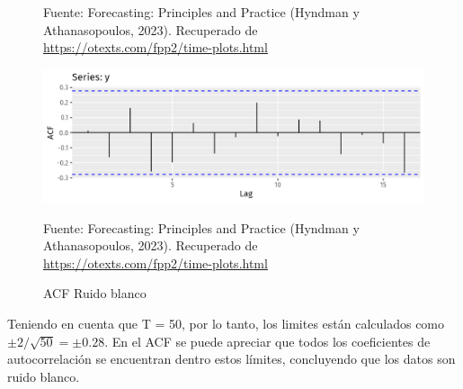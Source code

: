 \begin{itemize}
\begin{figure}[H]
        \begin{minipage}[t]{0.9\textwidth}
            Fuente: Forecasting: Principles and Practice (Hyndman y Athanasopoulos, 2023). Recuperado de \url{https://otexts.com/fpp2/time-plots.html}
        \end{minipage}
    \end{figure}

    \begin{figure}[H]
        \begin{minipage}[t]{0.9\textwidth}
            \caption{ACF Ruido blanco}
            \label{whitenoise2}        
        \end{minipage}
    
        \vspace{10pt}
    
        \begin{minipage}[b]{1.1\textwidth}
            \centering
            \includegraphics[width=\textwidth]{img/wnoiseacf-1.png}        
        \end{minipage}
    
        \begin{minipage}[t]{0.9\textwidth}
            Fuente: Forecasting: Principles and Practice (Hyndman y Athanasopoulos, 2023). Recuperado de \url{https://otexts.com/fpp2/time-plots.html}
        \end{minipage}
    \end{figure}

    Teniendo en cuenta que T = 50, por lo tanto, los limites están calculados como $\pm{2}/\sqrt{50}  = \pm{0.28}$. En el ACF se puede apreciar que todos los coeficientes de autocorrelación se encuentran dentro estos límites, concluyendo que los datos son ruido blanco.

\end{itemize}

